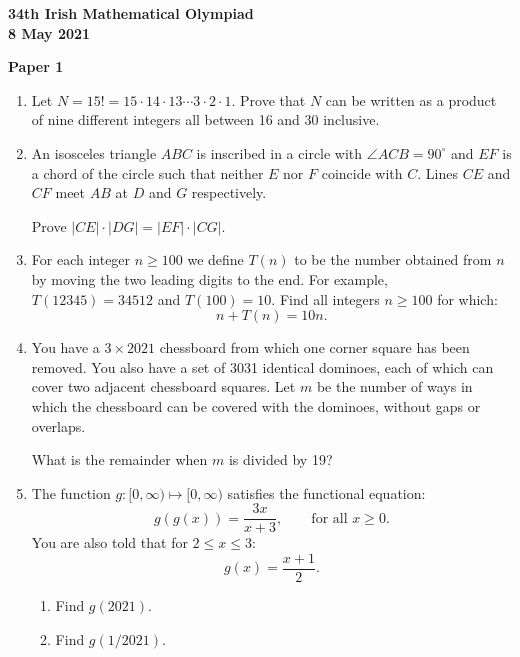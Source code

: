 \documentclass[12pt]{article}
\begin{document}
\begin{center}
{\large\bfseries 34th Irish Mathematical Olympiad\\8 May 2021}
\end{center}
\bigskip\noindent\textbf{Paper 1}\bigskip
\begin{enumerate}
\item Let $N = 15! = 15 \cdot 14 \cdot 13 \cdots 3 \cdot 2 \cdot 1$. Prove that $N$ can be written as a product of nine different integers all between 16 and 30 inclusive.

\item An isosceles triangle $ABC$ is inscribed in a circle with $\angle ACB = 90^\circ$ and $EF$ is a chord of the circle such that neither $E$ nor $F$ coincide with $C$. Lines $CE$ and $CF$ meet $AB$ at $D$ and $G$ respectively.

Prove $|CE| \cdot |DG| = |EF| \cdot |CG|$.

\item For each integer $n \ge 100$ we define $T(n)$ to be the number obtained from $n$ by moving the two leading digits to the end. For example, $T(12345) = 34512$ and $T(100) = 10$. Find all integers $n \ge 100$ for which:
\[
n + T(n) = 10n.
\]

\item You have a $3 \times 2021$ chessboard from which one corner square has been removed. You also have a set of 3031 identical dominoes, each of which can cover two adjacent chessboard squares. Let $m$ be the number of ways in which the chessboard can be covered with the dominoes, without gaps or overlaps.

What is the remainder when $m$ is divided by 19?

\item The function $g : [0, \infty) \mapsto [0, \infty)$ satisfies the functional equation:
\[
g(g(x)) = \frac{3x}{x + 3}, \qquad \text{for all } x \ge 0.
\]
You are also told that for $2 \le x \le 3$:
\[
g(x) = \frac{x + 1}{2}.
\]
\begin{enumerate}
\item[(a)] Find $g(2021)$.
\item[(b)] Find $g(1/2021)$.
\end{enumerate}
\end{enumerate}
\end{document}
